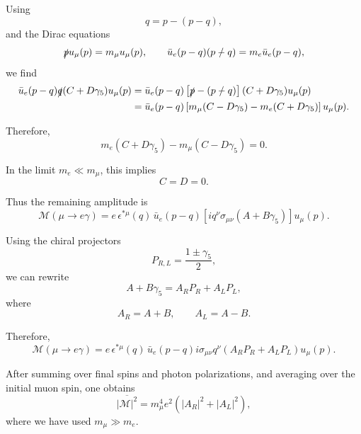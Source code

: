 \documentclass[11pt]{article}
\begin{document}
Using
\begin{equation}
    q = p - (p-q),
\end{equation}
and the Dirac equations
\begin{equation}
    \slashed{p} u_\mu(p)=m_\mu u_\mu(p),
    \qquad
    \bar{u}_e(p-q)\slashed{(p-q)}=m_e \bar{u}_e(p-q),
\end{equation}
we find
\begin{align}
    \bar{u}_e(p-q)\slashed{q}(C+D\gamma_5)u_\mu(p)
    &=
    \bar{u}_e(p-q)
    \left[
        \slashed{p} - \slashed{(p-q)}
    \right]
    (C+D\gamma_5)u_\mu(p)
    \notag \\
    &=
    \bar{u}_e(p-q)
    \left[
        m_\mu(C-D\gamma_5)
        -
        m_e(C+D\gamma_5)
    \right]
    u_\mu(p).
\end{align}

Therefore,
\begin{equation}
    m_e(C+D\gamma_5)-m_\mu(C-D\gamma_5)=0.
\end{equation}

In the limit $m_e \ll m_\mu$, this implies
\begin{equation}
    C=D=0.
\end{equation}

Thus the remaining amplitude is
\begin{equation}
    \mathcal{M}(\mu \to e\gamma)
    =
    e\,\epsilon^{*\mu}(q)\,
    \bar{u}_e(p-q)
    \left[
        i q^\nu \sigma_{\mu\nu}(A+B\gamma_5)
    \right]
    u_\mu(p).
\end{equation}

Using the chiral projectors
\begin{equation}
    P_{R,L} = \frac{1\pm \gamma_5}{2},
\end{equation}
we can rewrite
\begin{equation}
    A+B\gamma_5 = A_R P_R + A_L P_L,
\end{equation}
where
\begin{equation}
    A_R = A+B,
    \qquad
    A_L = A-B.
\end{equation}

Therefore,
\begin{equation}
    \mathcal{M}(\mu \to e\gamma)
    =
    e\,\epsilon^{*\mu}(q)\,
    \bar{u}_e(p-q)
    i\sigma_{\mu\nu}q^\nu
    \left(
        A_R P_R + A_L P_L
    \right)
    u_\mu(p).
\end{equation}

After summing over final spins and photon polarizations, and averaging over the initial muon spin, one obtains
\begin{equation}
    \overline{|\mathcal{M}|^2}
    =
    m_\mu^4 e^2
    \left(
        |A_R|^2 + |A_L|^2
    \right),
\end{equation}
where we have used $m_\mu \gg m_e$.
\end{document}
